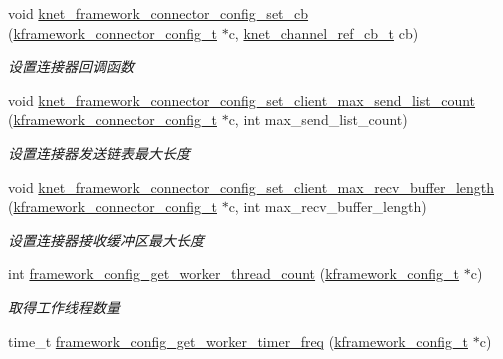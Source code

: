 \begin{DoxyCompactItemize}
void \hyperlink{a00111_ga03024112cca453db282a4aa4af7bedc8_ga03024112cca453db282a4aa4af7bedc8}{knet\+\_\+framework\+\_\+connector\+\_\+config\+\_\+set\+\_\+cb} (\hyperlink{a00054_a44d3033eba5a4fd784a741700a7a2521_a44d3033eba5a4fd784a741700a7a2521}{kframework\+\_\+connector\+\_\+config\+\_\+t} $\ast$c, \hyperlink{a00054_a8a7d96123ef4565c6d08fe58a10476a9_a8a7d96123ef4565c6d08fe58a10476a9}{knet\+\_\+channel\+\_\+ref\+\_\+cb\+\_\+t} cb)
\begin{DoxyCompactList}\small\item\em 设置连接器回调函数 \end{DoxyCompactList}\item 
void \hyperlink{a00111_ga32b058fe0a17d4a609097157761bb9f1_ga32b058fe0a17d4a609097157761bb9f1}{knet\+\_\+framework\+\_\+connector\+\_\+config\+\_\+set\+\_\+client\+\_\+max\+\_\+send\+\_\+list\+\_\+count} (\hyperlink{a00054_a44d3033eba5a4fd784a741700a7a2521_a44d3033eba5a4fd784a741700a7a2521}{kframework\+\_\+connector\+\_\+config\+\_\+t} $\ast$c, int max\+\_\+send\+\_\+list\+\_\+count)
\begin{DoxyCompactList}\small\item\em 设置连接器发送链表最大长度 \end{DoxyCompactList}\item 
void \hyperlink{a00111_ga671b44cb682198b418b21749e6b2fdbe_ga671b44cb682198b418b21749e6b2fdbe}{knet\+\_\+framework\+\_\+connector\+\_\+config\+\_\+set\+\_\+client\+\_\+max\+\_\+recv\+\_\+buffer\+\_\+length} (\hyperlink{a00054_a44d3033eba5a4fd784a741700a7a2521_a44d3033eba5a4fd784a741700a7a2521}{kframework\+\_\+connector\+\_\+config\+\_\+t} $\ast$c, int max\+\_\+recv\+\_\+buffer\+\_\+length)
\begin{DoxyCompactList}\small\item\em 设置连接器接收缓冲区最大长度 \end{DoxyCompactList}\item 
int \hyperlink{a00058_aafb4c7a8913ed48592037da43edd8e39_aafb4c7a8913ed48592037da43edd8e39}{framework\+\_\+config\+\_\+get\+\_\+worker\+\_\+thread\+\_\+count} (\hyperlink{a00054_adeaf952e0f0887507ff836385bf54874_adeaf952e0f0887507ff836385bf54874}{kframework\+\_\+config\+\_\+t} $\ast$c)
\begin{DoxyCompactList}\small\item\em 取得工作线程数量 \end{DoxyCompactList}\item 
time\+\_\+t \hyperlink{a00058_ab0815a3aff5ee221ba2870899e25f045_ab0815a3aff5ee221ba2870899e25f045}{framework\+\_\+config\+\_\+get\+\_\+worker\+\_\+timer\+\_\+freq} (\hyperlink{a00054_adeaf952e0f0887507ff836385bf54874_adeaf952e0f0887507ff836385bf54874}{kframework\+\_\+config\+\_\+t} $\ast$c)

\end{DoxyCompactItemize}
